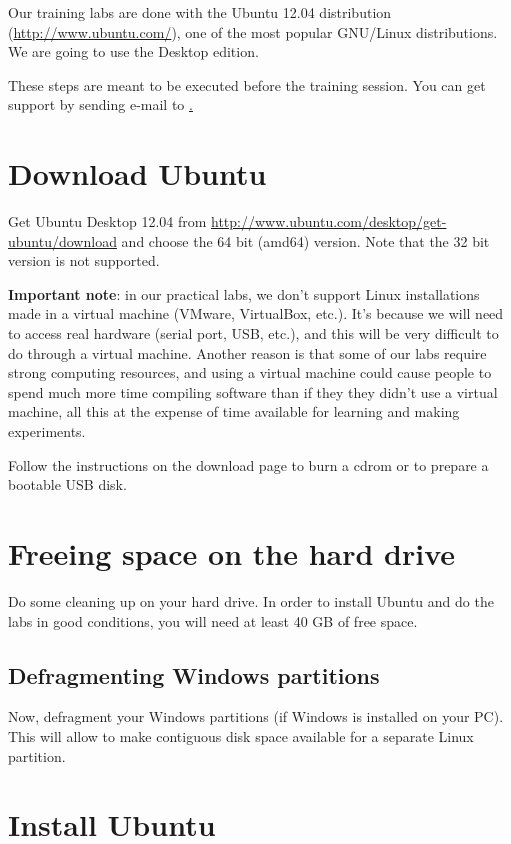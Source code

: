 
Our training labs are done with the Ubuntu 12.04 distribution
(\url{http://www.ubuntu.com/}), one of the most popular GNU/Linux distributions. We
are going to use the Desktop edition.

These steps are meant to be executed before the training session. You can get
support by sending e-mail to \href{mailto: support@free-electrons.com}.

\section{Download Ubuntu}

Get Ubuntu Desktop 12.04 from
\url{http://www.ubuntu.com/desktop/get-ubuntu/download} and choose the
64 bit (amd64) version. Note that the 32 bit version is not supported.

{\bf Important note}: in our practical labs, we don't support Linux installations made
in a virtual machine (VMware, VirtualBox, etc.). It's because we will need to
access real hardware (serial port, USB, etc.), and this will be very difficult
to do through a virtual machine. Another reason is that some of our labs
require strong computing resources, and using a virtual machine could
cause people to spend much more time compiling software than if they they
didn't use a virtual machine, all this at the expense of time available
for learning and making experiments.

Follow the instructions on the download page to burn a cdrom or to
prepare a bootable USB disk.

\section{Freeing space on the hard drive}

Do some cleaning up on your hard drive. In order to install Ubuntu and do the
labs in good conditions, you will need at least 40 GB of free space.

\subsection{Defragmenting Windows partitions}
Now, defragment your Windows partitions (if Windows is installed on your
PC). This will allow to make contiguous disk space available for a separate
Linux partition.

\section{Install Ubuntu}

